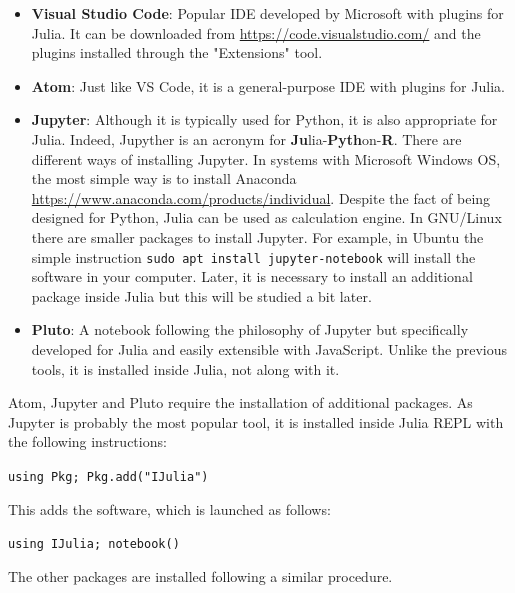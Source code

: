 \begin{itemize}
	\item \textbf{Visual Studio Code}: Popular IDE developed by Microsoft with plugins for Julia. It can be downloaded from \href{https://code.visualstudio.com/}{https://code.visualstudio.com/} and the plugins installed through the "Extensions" tool.
	\item \textbf{Atom}: Just like VS Code, it is a general-purpose IDE with plugins for Julia.
	\item \textbf{Jupyter}: Although it is typically used for Python, it is also appropriate for Julia. Indeed, Jupyther is an acronym for \textbf{Ju}lia-\textbf{Pyth}on-\textbf{R}. There are different ways of installing Jupyter. In systems with Microsoft Windows OS, the most simple way is to install Anaconda \href{https://www.anaconda.com/products/individual}{https://www.anaconda.com/products/individual}. Despite the fact of being designed for Python, Julia can be used as calculation engine. In GNU/Linux there are smaller packages to install Jupyter. For example, in Ubuntu the simple instruction \texttt{sudo apt install jupyter-notebook} will install the software in your computer. Later, it is necessary to install an additional package inside Julia but this will be studied a bit later.
	\item \textbf{Pluto}: A notebook following the philosophy of Jupyter but specifically developed for Julia and easily extensible with JavaScript. Unlike the previous tools, it is installed inside Julia, not along with it. 
\end{itemize}
%
Atom, Jupyter and Pluto require the installation of additional packages. As Jupyter is probably the most popular tool, it is installed inside Julia REPL with the following instructions:

\vspace{1mm}
\begin{center}
	\texttt{using Pkg; Pkg.add("IJulia")}
\end{center}
\vspace{1mm}

This adds the software, which is launched as follows:

\vspace{1mm}
\begin{center}
	\texttt{using IJulia; notebook()} 
\end{center}
\vspace{1mm}

The other packages are installed following a similar procedure. 

